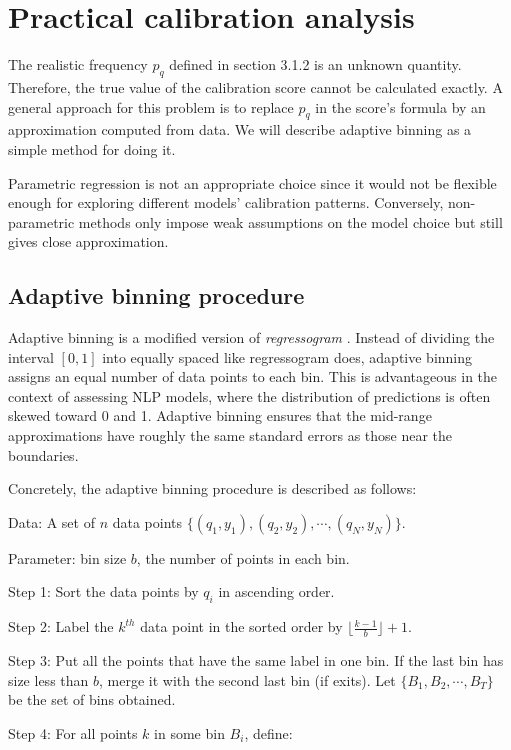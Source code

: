 \section{Practical calibration analysis}

The realistic frequency $p_q$ defined in section 3.1.2 is an unknown quantity. Therefore, the true value of the calibration score cannot be calculated exactly. A general approach for this problem is to replace $p_q$ in the score's formula by an approximation computed from data. We will describe adaptive binning as a simple method for doing it.

Parametric regression is not an appropriate choice since it would not be flexible enough for exploring different models' calibration patterns. Conversely, non-parametric methods only impose weak assumptions on the model choice but still gives close approximation.

\subsection{Adaptive binning procedure}

Adaptive binning is a modified version of \textit{regressogram} \citep{wasserman2006all}. Instead of dividing the interval $[0, 1]$ into equally spaced like regressogram does, adaptive binning assigns an equal number of data points to each bin. This is advantageous in the context of assessing NLP models, where the distribution of predictions is often skewed toward 0 and 1. Adaptive binning ensures that the mid-range approximations have roughly the same standard errors as those near the boundaries.

Concretely, the adaptive binning procedure is described as follows:

Data: A set of $n$ data points $\{(q_1, y_1), (q_2, y_2), \cdots, (q_N, y_N)\}$.

Parameter: bin size $b$, the number of points in each bin.

Step 1: Sort the data points by $q_i$ in ascending order.

Step 2: Label the $k^{th}$ data point in the sorted order by $\lfloor \frac{k - 1}{b}\rfloor + 1$.

Step 3: Put all the points that have the same label in one bin. If the last bin has size less than $b$, merge it with the second last bin (if exits). Let $\{B_1, B_2, \cdots, B_T\}$ be the set of bins obtained.  

Step 4: For all points $k$ in some bin $B_i$, define:

